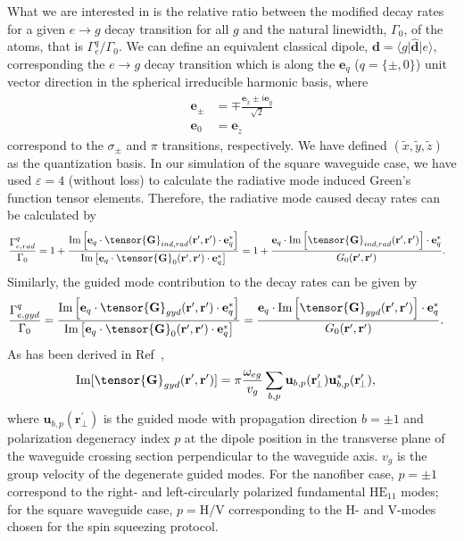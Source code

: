 \documentclass[preprint,aps,pra,onecolumn,superscriptaddress]{revtex4-1} %
\def\br{\mathbf{r}}
\def\bra#1{\langle{#1}\rvert}%
\def\ket#1{\lvert{#1}\rangle}%
\newcommand{\SWG}{square waveguide\xspace}%
\begin{document}
\begin{appendix}
    
What we are interested in is the relative ratio between the modified decay rates for a given $e\rightarrow g$ decay transition for all $ g $ and the natural linewidth, $ \Gamma_0 $, of the atoms, that is $ \Gamma_e^q/\Gamma_0 $. 
We can define an equivalent classical dipole, $ \mathbf{d}=\bra{g}\hat{\mathbf{d}}\ket{e} $, corresponding the $ e\rightarrow g $ decay transition which is along the $ \mathbf{e}_q $ ($q=\{\pm,0\}$) unit vector direction in the spherical irreducible harmonic basis, where
\begin{align}
    \mathbf{e}_\pm &=\mp \frac{\mathbf{e}_{\tilde{x}}\pm i\mathbf{e}_{\tilde{y}}}{\sqrt{2}}\\
    \mathbf{e}_0 &=\mathbf{e}_{\tilde{z}}
\end{align}
correspond to the $\sigma_\pm$ and $\pi$ transitions, respectively.
We have defined $ (\tilde{x},\tilde{y},\tilde{z}) $ as the quantization basis.
In our simulation of the square waveguide case, we have used $\varepsilon=4$ (without loss) to calculate the radiative mode induced Green's function tensor elements.
Therefore, the radiative mode caused decay rates can be calculated by
\begin{align}
\frac{\Gamma_{e,rad}^{q}}{\Gamma_0} &= 1+ \frac{\mathrm{Im}\left[\mathbf{e}_q\cdot \tensor{\mathbf{G}}_{ind,rad}(\mathbf{r}',\mathbf{r}')\cdot \mathbf{e}_q^*\right]}{ \mathrm{Im}\left[\mathbf{e}_q\cdot \tensor{\mathbf{G}}_0(\mathbf{r}',\mathbf{r}')\cdot \mathbf{e}_q^*\right]}
=1+ \frac{\mathbf{e}_q\cdot \mathrm{Im}\left[\tensor{\mathbf{G}}_{ind,rad}(\mathbf{r}',\mathbf{r}')\right]\cdot \mathbf{e}_q^*}{G_0(\mathbf{r}',\mathbf{r}')}.\label{eq:Gammaeq_rad}
\end{align}
Similarly, the guided mode contribution to the decay rates can be given by
\begin{align}
\frac{\Gamma_{e,gyd}^{q}}{\Gamma_0} &= \frac{\mathrm{Im}\left[\mathbf{e}_q\cdot \tensor{\mathbf{G}}_{gyd}(\mathbf{r}',\mathbf{r}')\cdot \mathbf{e}_q^*\right]}{ \mathrm{Im}\left[\mathbf{e}_q\cdot \tensor{\mathbf{G}}_0(\mathbf{r}',\mathbf{r}')\cdot \mathbf{e}_q^*\right]}
= \frac{\mathbf{e}_q\cdot \mathrm{Im}\left[ \tensor{\mathbf{G}}_{gyd}(\mathbf{r}',\mathbf{r}')\right]\cdot \mathbf{e}_q^*}{ G_0(\mathbf{r}',\mathbf{r}')}.\label{eq:Gammaeq_guide}
\end{align}
As has been derived in Ref~\cite{Qi2016},
\begin{align}
\mathrm{Im}[\tensor{\mathbf{G}}_{gyd}(\br',\br')] &= \pi \frac{\omega_{eg}}{v_g } \sum_{b, p} 
		\mathbf{u}_{b, p} (\br_{\!\perp}^\prime)\mathbf{u}^*_{b , p} (\br_{\!\perp}^\prime),
\end{align}
where $\mathbf{u}_{b, p} (\br_{\!\perp}^\prime)$ is the guided mode with propagation direction $ b=\pm 1 $ and polarization degeneracy index $ p $ at the dipole position in the transverse plane of the waveguide crossing section perpendicular to the waveguide axis.
$v_g$ is the group velocity of the degenerate guided modes.
For the nanofiber case, $ p=\pm 1 $ correspond to the right- and left-circularly polarized fundamental $\mathrm{HE}_{11}$ modes; 
for the \SWG case, $ p=\mathrm{H}/\mathrm{V} $ corresponding to the H- and V-modes chosen for the spin squeezing protocol.


\end{appendix}
\end{document}
